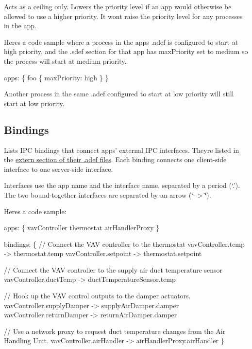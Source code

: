Acts as a ceiling only. Lowers the priority level if an app would otherwise be allowed to use a higher priority. It won\textquotesingle{}t raise the priority level for any processes in the app.

Here\textquotesingle{}s a code sample where a process in the app\textquotesingle{}s .adef is configured to start at high priority, and the .sdef section for that app has max\+Priority set to {\ttfamily medium} so the process will start at medium priority.


\begin{DoxyCode}
apps:
\{
    foo
    \{
        maxPriority: high
    \}
\}
\end{DoxyCode}


Another process in the same .adef configured to start at low priority will still start at low priority.\hypertarget{def_files_sdef_defFilesSdef_bindings}{}\subsection{Bindings}\label{def_files_sdef_defFilesSdef_bindings}
Lists I\+P\+C {\ttfamily bindings} that connect apps’ external I\+P\+C interfaces. They\textquotesingle{}re listed in the \hyperlink{def_files_adef_defFilesAdef_extern}{extern section of their {\ttfamily }.adef files}. Each binding connects one client-\/side interface to one server-\/side interface.

Interfaces use the app name and the interface name, separated by a period (‘.\+’). The two bound-\/together interfaces are separated by an arrow (\char`\"{}-\/$>$\char`\"{}).

Here\textquotesingle{}s a code sample\+:


\begin{DoxyCode}
apps:
\{
    vavController
    thermostat
    airHandlerProxy
\}

bindings:
\{
    \textcolor{comment}{// Connect the VAV controller to the thermostat}
    vavController.temp -> thermostat.temp
    vavController.setpoint -> thermostat.setpoint

    \textcolor{comment}{// Connect the VAV controller to the supply air duct temperature sensor}
    vavController.ductTemp -> ductTemperatureSensor.temp

    \textcolor{comment}{// Hook up the VAV control outputs to the damper actuators.}
    vavController.supplyDamper -> supplyAirDamper.damper
    vavController.returnDamper -> returnAirDamper.damper

    \textcolor{comment}{// Use a network proxy to request duct temperature changes from the Air Handling Unit.}
    vavController.airHandler -> airHandlerProxy.airHandler
\}
\end{DoxyCode}


